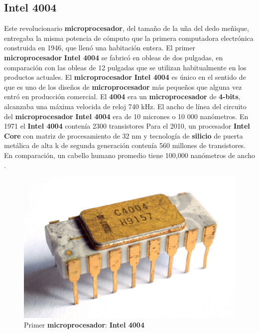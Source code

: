 \subsection{\textbf{Intel 4004}}
Este revolucionario \textbf{microprocesador}, del tamaño de la uña del dedo meñique, entregaba la misma potencia de cómputo que la primera
computadora electrónica construida en 1946, que llenó una habitación entera. El primer \textbf{microprocesador} \textbf{Intel 4004} se
fabricó en obleas de dos pulgadas, en comparación con las obleas de 12 pulgadas que se utilizan habitualmente en los productos actuales.
El \textbf {microprocesador} \textbf{Intel 4004} es único en el sentido de que es uno de los diseños de \textbf{microprocesador} más
pequeños que alguna vez entró en producción comercial. El \textbf{4004}  era un \textbf{microprocesador} de \textbf{4-bits}, alcanzaba una máxima
velocida de reloj 740 kHz. El ancho de línea del circuito del \textbf{microprocesador} \textbf{Intel 4004} era de 10 micrones o 10 000
nanómetros. En 1971 el \textbf{Intel 4004} contenía 2300 transistores Para el 2010, un procesador \textbf{Intel Core} con matriz de procesamiento
de 32 nm y tecnología de \textbf{silicio} de puerta metálica de alta k de segunda generación contenía  560 millones de transistores. En comparación,
un cabello humano promedio tiene 100,000 nanómetros de ancho .      

\begin{figure}[htb]
	\centering
	\includegraphics[scale = 0.15]{Graphics/Intel_C4004.jpg}
	\caption{Primer \textbf{microprocesador}: \textbf{Intel 4004}}
	\label{fig:12}
\end{figure}


